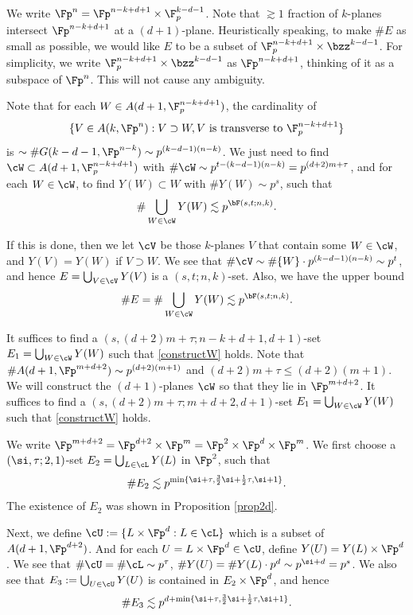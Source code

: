 We write $\Fp^n=\Fp^{n-k+d+1}\times \F_p^{k-d-1}$. Note that $\gtrsim 1$ fraction of $k$-planes intersect $\Fp^{n-k+d+1}$ at a $(d+1)$-plane. Heuristically speaking, to make $\#E$ as small as possible, we would like $E$ to be a subset of $\F_p^{n-k+d+1}\times \bzz^{k-d-1}$. For simplicity, we write $\F_p^{n-k+d+1}\times \bzz^{k-d-1}$ as $\Fp^{n-k+d+1}$, thinking of it as a subspace of $\Fp^n$. This will not cause any ambiguity.

Note that for each $W\in A(d+1,\F_p^{n-k+d+1})$, the cardinality of 
\[\{V\in A(k,\Fp^n): V\supset W,  V \textup{~is~transverse~to~} \F_p^{n-k+d+1} \}\] 
is $\sim \#G(k-d-1,\Fp^{n-k})\sim p^{(k-d-1)(n-k)}$. We just need to find $\cW\subset A(d+1,\F_p^{n-k+d+1})$ with $\#\cW\sim p^{t-(k-d-1)(n-k)}=p^{(d+2)m+\tau}$, and for each $W\in\cW$, to find $Y(W)\subset W$ with $\#Y(W)\sim p^{s}$, such that
\begin{equation}\label{constructW}
    \#\bigcup_{W\in\cW} Y(W)\lesssim p^{\bF(s,t;n,k)}.
\end{equation}

If this is done, then we let $\cV$ be those $k$-planes $V$ that contain some $W\in\cW$, and $Y(V)=Y(W)$ if $V\supset W$. We see that $\#\cV\sim \#\{W\}\cdot p^{(k-d-1)(n-k)}\sim p^t$, and hence $E=\bigcup_{V\in\cV} Y(V)$ is a $(s,t;n,k)$-set. Also, we have the upper bound
\[ \#E=\#\bigcup_{W\in\cW} Y(W)\lesssim p^{\bF(s,t;n,k)}. \]

It suffices to find a $(s,(d+2)m+\tau;n-k+d+1,d+1)$-set $E_1=\bigcup_{W\in\cW} Y(W)$ such that \eqref{constructW} holds. 
Note that $\#A(d+1,\Fp^{m+d+2})\sim p^{(d+2)(m+1)}$ and $(d+2)m+\tau\le (d+2)(m+1)$. We will construct the $(d+1)$-planes $\cW$ so that they lie in $\Fp^{m+d+2}$. 
It suffices to find a $(s,(d+2)m+\tau;m+d+2,d+1)$-set $E_1=\bigcup_{W\in\cW} Y(W)$ such that \eqref{constructW} holds.

We write $\Fp^{m+d+2}=\Fp^{d+2}\times\Fp^{m}=\Fp^2\times \Fp^d\times \Fp^m$. We first choose a $(\si,\tau;2,1)$-set $E_2=\bigcup_{L\in\cL}Y(L)$ in $\Fp^2$, such that
\[\#E_2\lesssim p^{\min\{\si+\tau,\frac32\si+\frac12\tau,\si+1\}}. \]
The existence of $E_2$ was shown in Proposition \ref{prop2d}.

Next, we define $\cU:=\{L\times \Fp^d: L\in\cL\}$ which is a subset of $A(d+1,\Fp^{d+2})$. And for each $U=L\times \Fp^d\in\cU$, define $Y(U)=Y(L)\times \Fp^d$. We see that $\#\cU= \#\cL\sim p^\tau$, $\#Y(U)=\#Y(L)\cdot p^d\sim p^{\si+d}=p^s$. We also see that $E_3:=\bigcup_{U\in \cU}Y(U)$ is contained in $E_2\times \Fp^d$, and hence \[\#E_3\lesssim p^{d+\min\{\si+\tau,\frac32\si+\frac12\tau,\si+1\}}.\]

